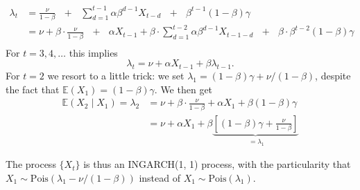 \documentclass[10pt,a4paper]{article}
\begin{document}
\begin{align*}
\lambda_t & = \frac{\nu}{1 - \beta} \ \ \ + \ \ \ \sum_{d = 1}^{t - 1}\alpha\beta^{d - 1}X_{t - d} \ \ \ + \ \ \ \beta^{t - 1} (1 - \beta)\gamma\\
& = \nu + \beta \cdot \frac{\nu}{1 - \beta} \ \ \ + \ \ \ \alpha X_{t - 1} + \beta \cdot \sum_{d = 1}^{t - 2} \alpha\beta^{d - 1} X_{t - 1 - d}  \ \ \ + \ \ \ \beta \cdot \beta^{t - 2} (1 - \beta)\gamma\\
\end{align*}
For $t = 3, 4, \dots$ this implies
$$
\lambda_t = \nu + \alpha X_{t - 1} + \beta \lambda_{t - 1}.
$$
For $t = 2$ we resort to a little trick: we set $\lambda_1 = (1 - \beta)\gamma + \nu/(1 - \beta)$, despite the fact that $\mathbb{E}(X_1) = (1 - \beta)\gamma$. We then get
\begin{align*}
\mathbb{E}(X_2 \mid X_1) = \lambda_2 & = \nu + \beta \cdot \frac{\nu}{1 - \beta} + \alpha X_1 + \beta(1 - \beta)\gamma\\
& = \nu + \alpha X_1 + \beta \underbrace{\left[(1 - \beta)\gamma + \frac{\nu}{1 - \beta}\right]}_{\:= \lambda_1}
\end{align*}

The process $\{X_t\}$ is thus an INGARCH(1, 1) process, with the particularity that $X_1 \sim\text{Pois}(\lambda_1 - \nu/(1 - \beta))$ instead of $X_1 \sim\text{Pois}(\lambda_1)$.
\end{document}
